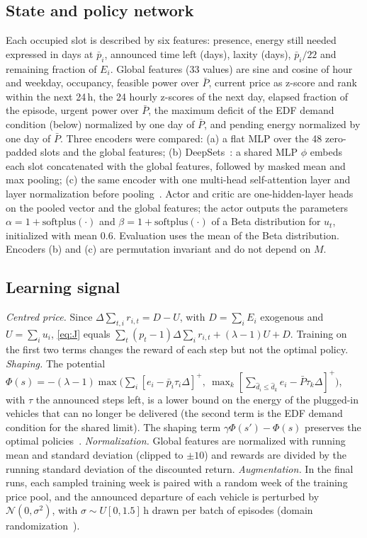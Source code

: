 \documentclass[conference]{IEEEtran}
\begin{document}
\subsection{State and policy network}
Each occupied slot is described by six features: presence, energy still needed expressed in days at
$\bar p_i$, announced time left (days), laxity (days), $\bar p_i/22$ and remaining fraction of
$E_i$. Global features (33 values) are sine and cosine of hour and weekday, occupancy, feasible
power over $\bar P$, current price as z-score and rank within the next 24\,h, the 24 hourly
z-scores of the next day, elapsed fraction of the episode, urgent power over $\bar P$, the maximum
deficit of the EDF demand condition (below) normalized by one day of $\bar P$, and pending energy
normalized by one day of $\bar P$. Three encoders were compared: (a) a flat MLP over the 48
zero-padded slots and the global features; (b) DeepSets~\cite{zaheer2017deepsets}: a shared MLP
$\phi$ embeds each slot concatenated with the global features, followed by masked mean and max
pooling; (c) the same encoder with one multi-head self-attention layer and layer normalization
before pooling~\cite{vaswani2017attention}. Actor and critic are one-hidden-layer heads on the
pooled vector and the global features; the actor outputs the parameters $\alpha=1+\mathrm{softplus}(\cdot)$
and $\beta=1+\mathrm{softplus}(\cdot)$ of a Beta distribution for $u_t$, initialized with mean 0.6.
Evaluation uses the mean of the Beta distribution. Encoders (b) and (c) are permutation invariant
and do not depend on $M$.

\subsection{Learning signal}
\emph{Centred price.} Since $\Delta\sum_{t,i}r_{i,t}=D-U$, with $D=\sum_iE_i$ exogenous and
$U=\sum_iu_i$, \eqref{eq:J} equals $\sum_t(p_t-1)\Delta\sum_ir_{i,t}+(\lambda-1)U+D$. Training on
the first two terms changes the reward of each step but not the optimal policy.
\emph{Shaping.} The potential
$\Phi(s)=-(\lambda-1)\max\!\big(\sum_i[e_i-\bar p_i\tau_i\Delta]^+,\ \max_k[\sum_{\hat d_i\le\hat d_k}e_i-\bar P\tau_k\Delta]^+\big)$,
with $\tau$ the announced steps left, is a lower bound on the energy of the plugged-in vehicles that
can no longer be delivered (the second term is the EDF demand condition for the shared limit). The
shaping term $\gamma\Phi(s')-\Phi(s)$ preserves the optimal policies~\cite{ng1999shaping}.
\emph{Normalization.} Global features are normalized with running mean and standard deviation
(clipped to $\pm10$) and rewards are divided by the running standard deviation of the discounted
return. \emph{Augmentation.} In the final runs, each sampled training week is paired with a random
week of the training price pool, and the announced departure of each vehicle is perturbed by
$\mathcal N(0,\sigma^2)$, with $\sigma\sim U[0,1.5]$\,h drawn per batch of episodes (domain
randomization~\cite{tobin2017domain}).
\end{document}
